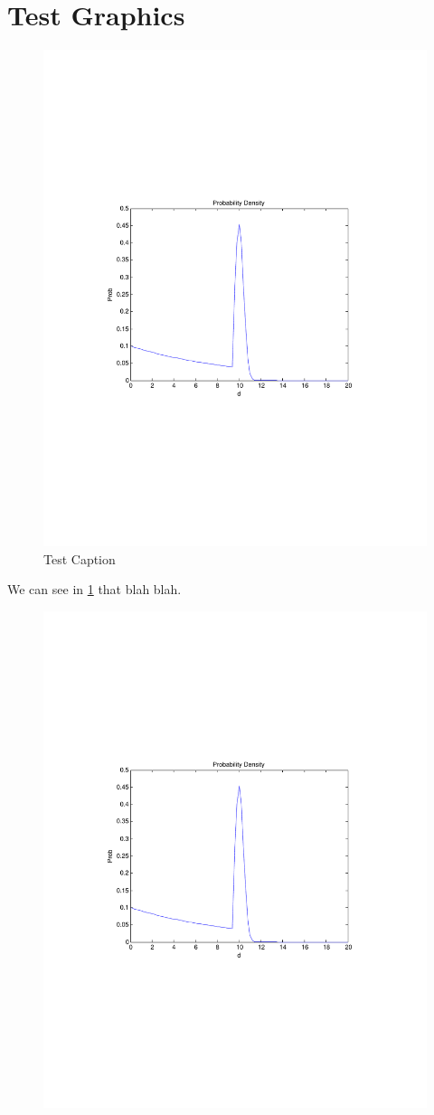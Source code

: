 \documentclass[10pt]{article}
\begin{document}
\section{Test Graphics}

\begin{center}
	\begin{figure}[H] %
		\includegraphics[width=0.4\linewidth]{ProbFunction}
		\caption{Test Caption}
		\label{fig:TestLabel}
	\end{figure}
\end{center} 
We can see in \ref{fig:TestLabel} that blah blah.

\begin{figure}[H] %
	\centering
	\includegraphics[width=0.4\linewidth]{ProbFunction}
\end{figure}
\end{document}
